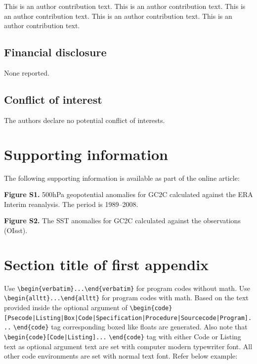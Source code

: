 \documentclass[AMA,STIX1COL]{WileyNJD-SP}
\begin{document}
This is an author contribution text. This is an author contribution text. This is an author contribution text. This is an author contribution text. This is an author contribution text. 

\subsection*{Financial disclosure}

None reported.

\subsection*{Conflict of interest}

The authors declare no potential conflict of interests.


\section*{Supporting information}

The following supporting information is available as part of the online article:

\noindent
\textbf{Figure S1.}
{500{\uns}hPa geopotential anomalies for GC2C calculated against the ERA Interim reanalysis. The period is 1989--2008.}

\noindent
\textbf{Figure S2.}
{The SST anomalies for GC2C calculated against the observations (OIsst).}


\appendix

\section{Section title of first appendix\label{app1}}

Use \verb+\begin{verbatim}...\end{verbatim}+ for program codes without math. Use \verb+\begin{alltt}...\end{alltt}+ for program codes with math. Based on the text provided inside the optional argument of \verb+\begin{code}[Psecode|Listing|Box|Code|+\hfill\break \verb+Specification|Procedure|Sourcecode|Program]...+ \verb+\end{code}+ tag corresponding boxed like floats are generated. Also note that \verb+\begin{code}[Code|Listing]...+ \verb+\end{code}+ tag with either Code or Listing text as optional argument text are set with computer modern typewriter font.  All other code environments are set with normal text font. Refer below example:
\end{document}
